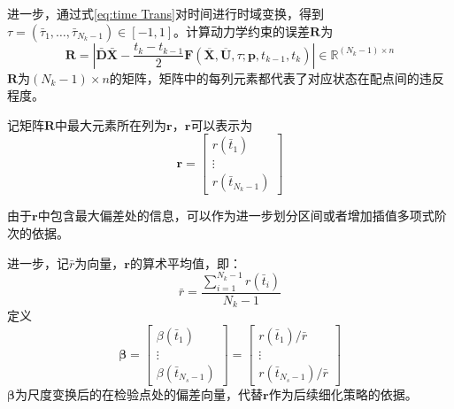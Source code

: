 进一步，通过式\eqref{eq:time Trans}对时间进行时域变换，得到$ \tau=\left(\bar{\tau}_{1}, \ldots, \bar{\tau}_{N_{k}-1}\right) \in[-1,1] $。计算动力学约束的误差$ \boldsymbol{R} $为
\begin{equation}
	\boldsymbol{R}=\left|\bar{\boldsymbol{ D }} \bar{\boldsymbol{X}}-\frac{t_{k}-t_{k-1}}{2} \boldsymbol{F}\left(\overline{\boldsymbol{X}}, \overline{\boldsymbol{U}}, \tau ; \boldsymbol{p}, t_{k-1}, t_{k}\right)\right| \in \mathbb{R}^{\left(N_{k}-1\right) \times n}
	\label{eq:residual func}
\end{equation}
$ \boldsymbol{R} $为$ (N_k-1)\times n  $的矩阵，矩阵中的每列元素都代表了对应状态在配点间的违反程度。


记矩阵$ \boldsymbol{R} $中最大元素所在列为$ \boldsymbol{r} $，$ \boldsymbol{r} $可以表示为
\begin{equation}
	\boldsymbol{r}=\left[\begin{array}{c}
			r\left(\bar{t}_{1}\right) \\
			\vdots                    \\
			r\left(\bar{t}_{N_{k}-1}\right)
		\end{array}\right]
\end{equation}

由于$ \boldsymbol{r} $中包含最大偏差处的信息，可以作为进一步划分区间或者增加插值多项式阶次的依据。

进一步，记$ \bar{r}$为向量，$ \boldsymbol{r} $的算术平均值，即：
\begin{equation}
	\bar{r}=\frac{\sum_{i=1}^{N_{k}-1} r\left(\bar{t}_{i}\right)}{N_{k}-1}
\end{equation}
定义
\begin{equation}
	\boldsymbol{\beta}=\left[\begin{array}{c}
			\beta\left(\bar{t}_{1}\right) \\
			\vdots                        \\
			\beta\left(\bar{t}_{N_{s}-1}\right)
		\end{array}\right]=\left[\begin{array}{c}
			r\left(\bar{t}_{1}\right) / \bar{r} \\
			\vdots                              \\
			r\left(\bar{t}_{N_{s}-1}\right) / \bar{r}
		\end{array}\right]
\end{equation}
$ \bm{\beta} $为尺度变换后的在检验点处的偏差向量，代替$ \boldsymbol{r} $作为后续细化策略的依据。
